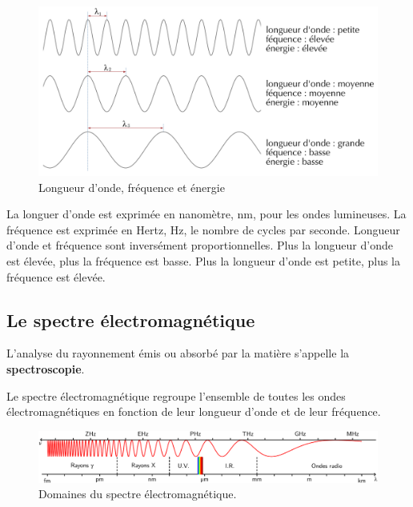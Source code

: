\documentclass[
  11pt,
  french,
  a4paper,
  openany]{book}
\begin{document}
\begin{figure}

{\centering \includegraphics[width=0.75\linewidth]{images/ondes-electromagnetiques} 

}

\caption{Longueur d'onde, fréquence et énergie}\label{fig:ondes-electromagnetiques}
\end{figure}

La longuer d'onde est exprimée en nanomètre, nm, pour les ondes lumineuses. La fréquence est exprimée en Hertz, Hz, le nombre de cycles par seconde. Longueur d'onde et fréquence sont inversément proportionnelles. Plus la longueur d'onde est élevée, plus la fréquence est basse. Plus la longueur d'onde est petite, plus la fréquence est élevée.

\hypertarget{le-spectre-uxe9lectromagnuxe9tique}{%
\subsection{Le spectre électromagnétique}\label{le-spectre-uxe9lectromagnuxe9tique}}

L'analyse du rayonnement émis ou absorbé par la matière s'appelle la \textbf{spectroscopie}.

Le spectre électromagnétique regroupe l'ensemble de toutes les ondes électromagnétiques en fonction de leur longueur d'onde et de leur fréquence.

\begin{figure}

{\centering \includegraphics[width=0.95\linewidth]{images/domaine-spectre-electromagnetique} 

}

\caption{Domaines du spectre électromagnétique.}\label{fig:domaine-spectre-electromagnetique}
\end{figure}
\end{document}
